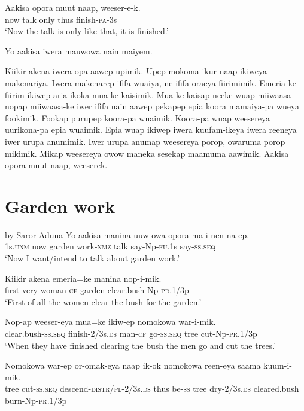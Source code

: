 \ea
\gll  Aakisa  opora  muut  naap,  weeser-e-k. \\
now  talk  only  thus  finish-\textsc{pa}-3s \\
\glt ‘Now the talk is only like that, it is finished.’ \\
\z

Yo aakisa iwera mauwowa nain maiyem.

Kiikir akena iwera opa aawep upimik. 
Upep mokoma ikur naap ikiweya makenariya. 
Iwera makenarep ififa wuaiya, ne ififa oraeya fiirimimik. 
Emeria-ke fiirim-ikiwep aria ikoka mua-ke kaisimik. 
Mua-ke kaisap neeke wuap miiwaasa nopap miiwaasa-ke iwer ififa nain aawep pekapep epia koora mamaiya-pa wueya fookimik. 
Fookap purupep koora-pa wuaimik. 
Koora-pa wuap weesereya uurikona-pa epia wuaimik. 
Epia wuap ikiwep iwera kuufam-ikeya iwera reeneya iwer urupa anumimik. 
Iwer urupa anumap weesereya porop, owaruma porop mikimik. 
Mikap weesereya owow maneka sesekap maamuma aawimik. 
\textrm{Aakisa opora muut naap, weeserek.}


\section{Garden work}\label{app:2:garden}
by Saror Aduna
\ea
\gll  Yo  aakisa  manina  uuw-owa  opora  ma-i-nen  na-ep. \\
1s.\textsc{unm}  now  garden  work-\textsc{nmz}  talk  say-Np-\textsc{fu}.1s  say-\textsc{ss.seq} \\
\glt ‘Now I want/intend to talk about garden work.’ \\
\z


\ea
\gll  Kiikir  akena  emeria=ke  manina  nop-i-mik. \\
first  very  woman-\textsc{cf}  garden  clear.bush-Np-\textsc{pr}.1/3p \\
\glt ‘First of all the women clear the bush for the garden.’ \\
\z


\ea
\gll  Nop-ap  weeser-eya  mua=ke  ikiw-ep  nomokowa         war-i-mik. \\
clear.bush-\textsc{ss.seq}  finish-2/3s.\textsc{ds}  man-\textsc{cf}  go-\textsc{ss.seq}  tree  cut-Np-\textsc{pr}.1/3p \\


\glt ‘When they have finished clearing the bush the men go and cut the trees.’ \\
\z


\ea
\gll  Nomokowa  war-ep  or-omak-eya  naap  ik-ok  nomokowa     reen-eya  saama  kuum-i-mik. \\
tree  cut-\textsc{ss.seq}  descend-\textsc{distr}/\textsc{pl}-2/3s.\textsc{ds}  thus  be-\textsc{ss}  tree  dry-2/3s.\textsc{ds}  cleared.bush  burn-Np-\textsc{pr}.1/3p \\


